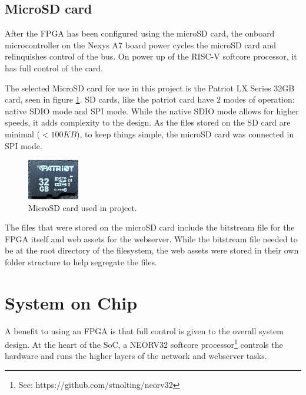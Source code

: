 \subsection{MicroSD card}

After the FPGA has been configured using the microSD card, the onboard microcontroller on the Nexys A7 board power cycles the microSD card and relinquishes control of the bus. On power up of the RISC-V softcore processor, it has full control of the card. 

The selected MicroSD card for use in this project is the Patriot LX Series 32GB card, seen in figure \ref{fig:microsd_card}. SD cards, like the patriot card have 2 modes of operation: native SDIO mode and SPI mode. While the native SDIO mode allows for higher speeds, it adds complexity to the design. As the files stored on the SD card are minimal ($< 100KB$), to keep things simple, the microSD card was connected in SPI mode.

\begin{figure}[h]
    \centering
    \includegraphics[width=0.2\textwidth]{Images/microsdcard.jpeg}
    \caption[MicroSD card used in project]{MicroSD card used in project.}
    \label{fig:microsd_card}
\end{figure}


The files that were stored on the microSD card include the bitstream file for the FPGA itself and web assets for the webserver. While the bitstream file needed to be at the root directory of the filesystem, the web assets were stored in their own folder structure to help segregate the files.  








 
\section{System on Chip}

A benefit to using an FPGA is that full control is given to the overall system design. At the heart of the SoC, a NEORV32 softcore processor\footnote[1]{See: https://github.com/stnolting/neorv32} controls the hardware and runs the higher layers of the network and webserver tasks.


